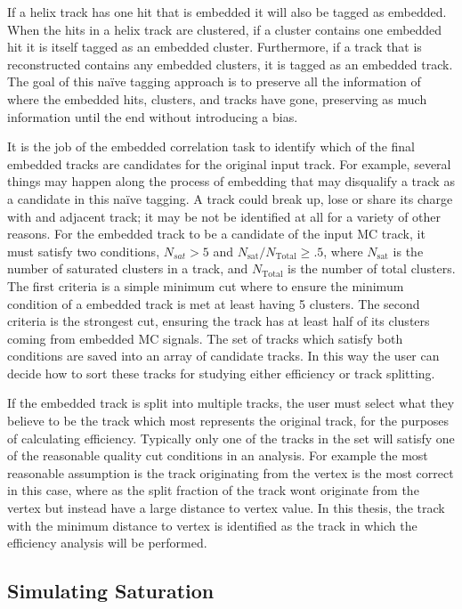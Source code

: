  If a helix track has one hit that is embedded it will also be tagged as embedded. When the hits in a helix track are clustered, if a cluster contains one embedded hit it is itself tagged as an embedded cluster. Furthermore, if a track that is reconstructed contains any embedded clusters, it is tagged as an embedded track. The goal of this na\"ive tagging approach is to preserve all the information of where the embedded hits, clusters, and tracks have gone, preserving as much information until the end without introducing a bias.
 
  It is the job of the embedded correlation task to identify which of the final embedded tracks are candidates for the original input track. For example, several things may happen along the process of embedding that may disqualify a track as a candidate in this na\"ive tagging. A track could break up, lose or share its charge with and adjacent track; it may be not be identified at all for a variety of other reasons. For the embedded track to be a candidate of the input MC track, it must satisfy two conditions, $N_{sat} > 5$ and $N_{\mathrm{sat}}/N_{\mathrm{Total}} \geq .5$, where $N_{\mathrm{sat}}$ is the number of saturated clusters in a track, and $N_{\mathrm{Total}}$ is the number of total clusters. The first criteria is a simple minimum cut where to ensure the minimum condition of a embedded track is met at least having 5 clusters. The second criteria is the strongest cut, ensuring the track has at least half of its clusters coming from embedded MC signals. The set of tracks which satisfy both conditions are saved into an array of candidate tracks. In this way the user can decide how to sort these tracks for studying either efficiency or track splitting. 

If the embedded track is split into multiple tracks, the user must select what they believe to be the track which most represents the original track, for the purposes of calculating efficiency. Typically only one of the tracks in the set will satisfy one of the reasonable quality cut conditions in an analysis. For example the most reasonable assumption is the track originating from the vertex is the most correct in this case, where as the split fraction of the track wont originate from the vertex but instead have a large distance to vertex value. In this thesis, the track with the minimum distance to vertex is identified as the track in which the efficiency analysis will be performed.



\subsection{Simulating Saturation}
\label{sec:simSat}

